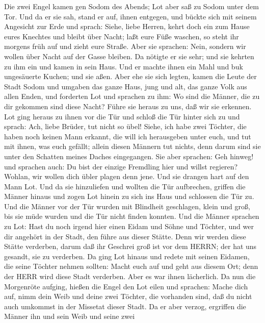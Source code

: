  Die zwei Engel kamen gen Sodom des Abends; Lot aber saß zu
Sodom unter dem Tor. Und da er sie sah, stand er auf, ihnen entgegen,
und bückte sich mit seinem Angesicht zur Erde  und sprach:
Siehe, liebe Herren, kehrt doch ein zum Hause eures Knechtes und bleibt
über Nacht; laßt eure Füße waschen, so steht ihr morgens früh auf und
zieht eure Straße. Aber sie sprachen: Nein, sondern wir wollen über
Nacht auf der Gasse bleiben.  Da nötigte er sie sehr; und
sie kehrten zu ihm ein und kamen in sein Haus. Und er machte ihnen ein
Mahl und buk ungesäuerte Kuchen; und sie aßen.  Aber ehe sie
sich legten, kamen die Leute der Stadt Sodom und umgaben das ganze Haus,
jung und alt, das ganze Volk aus allen Enden,  und forderten
Lot und sprachen zu ihm: Wo sind die Männer, die zu dir gekommen sind
diese Nacht? Führe sie heraus zu uns, daß wir sie erkennen. 
Lot ging heraus zu ihnen vor die Tür und schloß die Tür hinter sich zu
 und sprach: Ach, liebe Brüder, tut nicht so übel!
 Siehe, ich habe zwei Töchter, die haben noch keinen Mann
erkannt, die will ich herausgeben unter euch, und tut mit ihnen, was
euch gefällt; allein diesen Männern tut nichts, denn darum sind sie
unter den Schatten meines Daches eingegangen.  Sie aber
sprachen: Geh hinweg! und sprachen auch: Du bist der einzige Fremdling
hier und willst regieren? Wohlan, wir wollen dich übler plagen denn
jene. Und sie drangen hart auf den Mann Lot. Und da sie hinzuliefen und
wollten die Tür aufbrechen,  griffen die Männer hinaus und
zogen Lot hinein zu sich ins Haus und schlossen die Tür zu.
 Und die Männer vor der Tür wurden mit Blindheit
geschlagen, klein und groß, bis sie müde wurden und die Tür nicht finden
konnten.  Und die Männer sprachen zu Lot: Hast du noch
irgend hier einen Eidam und Söhne und Töchter, und wer dir angehört in
der Stadt, den führe aus dieser Stätte.  Denn wir werden
diese Stätte verderben, darum daß ihr Geschrei groß ist vor dem HERRN;
der hat uns gesandt, sie zu verderben.  Da ging Lot hinaus
und redete mit seinen Eidamen, die seine Töchter nehmen sollten: Macht
euch auf und geht aus diesem Ort; denn der HERR wird diese Stadt
verderben. Aber es war ihnen lächerlich.  Da nun die
Morgenröte aufging, hießen die Engel den Lot eilen und sprachen: Mache
dich auf, nimm dein Weib und deine zwei Töchter, die vorhanden sind, daß
du nicht auch umkommst in der Missetat dieser Stadt.  Da er
aber verzog, ergriffen die Männer ihn und sein Weib und seine zwei
